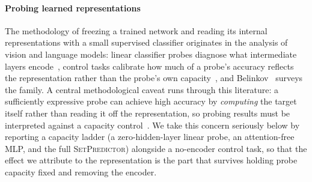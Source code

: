 \documentclass[11pt]{article}
\newcommand{\SetPredictor}{\textup{\textsc{SetPredictor}}}
\begin{document}
\paragraph{Probing learned representations} The methodology of freezing a trained network and reading its internal representations with a small supervised classifier originates in the analysis of vision and language models: linear classifier probes diagnose what intermediate layers encode~\cite{AlainBengio2017Probes}, control tasks calibrate how much of a probe's accuracy reflects the representation rather than the probe's own capacity~\cite{HewittLiang2019Probes}, and Belinkov~\cite{Belinkov2022Probing} surveys the family. A central methodological caveat runs through this literature: a sufficiently expressive probe can achieve high accuracy by \emph{computing} the target itself rather than reading it off the representation, so probing results must be interpreted against a capacity control~\cite{HewittLiang2019Probes}. We take this concern seriously below by reporting a capacity ladder (a zero-hidden-layer linear probe, an attention-free MLP, and the full \SetPredictor{}) alongside a no-encoder control task, so that the effect we attribute to the representation is the part that survives holding probe capacity fixed and removing the encoder.
\end{document}
